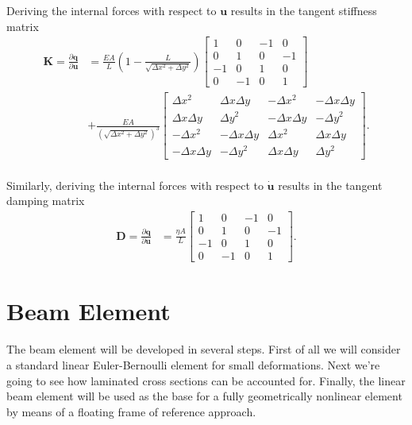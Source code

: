 Deriving the internal forces with respect to $\boldsymbol{u}$ results in the tangent stiffness matrix
%
\begin{align*}
\boldsymbol{K} = \frac{\partial \boldsymbol{q}}{\partial \boldsymbol{u}} &=
\frac{EA}{L}\left(1 - \frac{L}{\sqrt{\Delta x^2 + \Delta y^2}}\right)
\begin{bmatrix}
1 & 0 & -1 & 0\\
0 & 1 & 0 & -1\\
-1 & 0 & 1 & 0\\
0 & -1 & 0 & 1
\end{bmatrix}\\
&+
\frac{EA}{(\sqrt{\Delta x^2 + \Delta y^2})^{3}}
\begin{bmatrix}
\Delta x^2 & \Delta x \Delta y & -\Delta x^2 & -\Delta x \Delta y\\
\Delta x \Delta y & \Delta y^2 & -\Delta x \Delta y & - \Delta y^2\\
-\Delta x^2 & -\Delta x \Delta y & \Delta x^2 & \Delta x \Delta y\\
-\Delta x \Delta y & -\Delta y^2 & \Delta x \Delta y & \Delta y^2
\end{bmatrix}.\\
\end{align*}

Similarly, deriving the internal forces with respect to $\dot{\boldsymbol{u}}$ results in the tangent damping matrix
%
\begin{align*}
\boldsymbol{D} = \frac{\partial \boldsymbol{q}}{\partial \dot{\boldsymbol{u}}} &=
\frac{\eta A}{L}
\begin{bmatrix}
1 & 0 & -1 & 0\\
0 & 1 & 0 & -1\\
-1 & 0 & 1 & 0\\
0 & -1 & 0 & 1
\end{bmatrix}.
\end{align*}

\newpage
\section{Beam Element}

The beam element will be developed in several steps.
First of all we will consider a standard linear Euler-Bernoulli element for small deformations.
Next we're going to see how laminated cross sections can be accounted for.
Finally, the linear beam element will be used as the base for a fully geometrically nonlinear element by means of a floating frame of reference approach.


